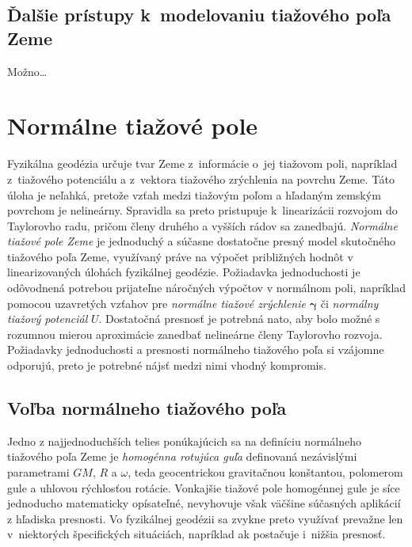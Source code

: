 \documentclass[a4paper,12pt]{book}
\begin{document}

\section{Ďalšie prístupy k~modelovaniu tiažového poľa Zeme}

Možno\dots










\chapter{Normálne tiažové pole}
\label{sec:normal_gravity_field}

Fyzikálna geodézia určuje tvar Zeme z~informácie o~jej tiažovom poli, napríklad 
z~tiažového potenciálu a z~vektora tiažového zrýchlenia na povrchu Zeme.  Táto 
úloha je neľahká, pretože vzťah medzi tiažovým poľom a hľadaným zemským 
povrchom je nelineárny.  Spravidla sa preto pristupuje k~linearizácii rozvojom 
do Taylorovho radu, pričom členy druhého a vyšších rádov sa zanedbajú.  
\emph{Normálne tiažové pole Zeme} je jednoduchý a súčasne dostatočne presný 
model skutočného tiažového poľa Zeme, využívaný práve na výpočet približných 
hodnôt v linearizovaných úlohách fyzikálnej geodézie.  Požiadavka jednoduchosti 
je odôvodnená potrebou prijateľne náročných výpočtov v normálnom poli, 
napríklad pomocou uzavretých vzťahov pre \emph{normálne tiažové zrýchlenie} 
$\boldsymbol{\gamma}$ či \emph{normálny tiažový potenciál} $U$.  Dostatočná 
presnosť je potrebná nato, aby bolo možné s rozumnou mierou aproximácie 
zanedbať nelineárne členy Taylorovho rozvoja.  Požiadavky jednoduchosti 
a presnosti normálneho tiažového poľa si vzájomne odporujú, preto je potrebné 
nájsť medzi nimi vhodný kompromis.

\section{Voľba normálneho tiažového poľa}

Jedno z najjednoduchších telies ponúkajúcich sa na definíciu normálneho 
tiažového poľa Zeme je \emph{homogénna rotujúca guľa} definovaná nezávislými 
parametrami $GM$, $R$ a $\omega$, teda geocentrickou gravitačnou konštantou, 
polomerom gule a uhlovou rýchlosťou rotácie.  Vonkajšie tiažové pole homogénnej 
gule je síce jednoducho matematicky opísateľné, nevyhovuje však väčšine 
súčasných aplikácií z hľadiska presnosti.  Vo fyzikálnej geodézii sa zvykne 
preto využívať prevažne len v~niektorých špecifických situáciách, napríklad ak 
postačuje i~nižšia presnosť.
\end{document}
